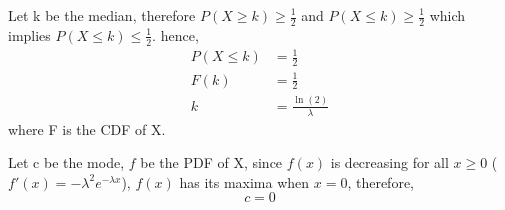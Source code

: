 Let k be the median, therefore $P(X \ge k) \ge \frac{1}{2}$ and $P(X \le k) \ge \frac{1}{2}$ which implies $P(X \le k) \le \frac{1}{2}$.
hence,
\begin{align*}
P(X \le k) &= \frac{1}{2} \\
F(k) &=  \frac{1}{2} \\
k &= \frac{\ln(2)}{\lambda}
\end{align*}
where F is the CDF of X.

Let c be the mode, $f$ be the PDF of X, since $f(x)$ is decreasing for all $x \ge 0$ ($f'(x) = -\lambda^{2}e^{-\lambda x}$), $f(x)$ has its maxima when $x=0$, therefore,
\[c = 0\]
